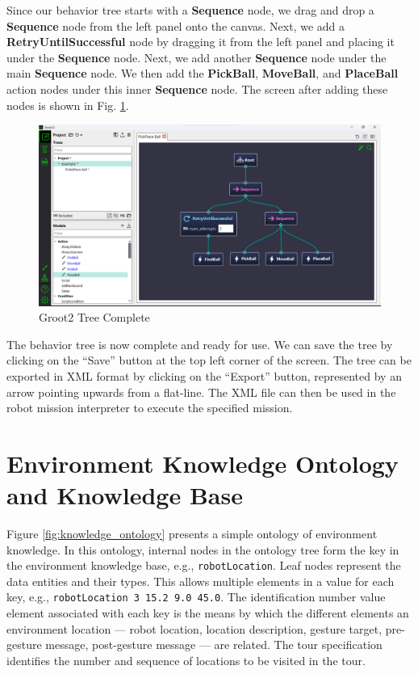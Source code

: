 \documentclass{CSSRforAfrica}
\begin{document}
Since our behavior tree starts with a \textbf{Sequence} node, we drag and drop a \textbf{Sequence} node from the left panel onto the canvas. Next, we add a \textbf{RetryUntilSuccessful} node by dragging it from the left panel and placing it under the \textbf{Sequence} node. Next, we add another \textbf{Sequence} node under the main \textbf{Sequence} node. We then add the \textbf{PickBall}, \textbf{MoveBall}, and \textbf{PlaceBall} action nodes under this inner \textbf{Sequence} node. The screen after adding these nodes is shown in Fig. \ref{fig:groo2_tree_complete}. 
\marginpar{\scriptsize }

\begin{figure}[H]
    \centering
    \includegraphics[width=120mm]{images/groot2_tree_complete.png}
    \caption{Groot2 Tree Complete}
    \label{fig:groo2_tree_complete}
\end{figure}

The behavior tree is now complete and ready for use. We can save the tree by clicking on the ``Save'' button at the top left corner of the screen. The tree can be exported in XML format by clicking on the ``Export'' button, represented by an arrow pointing upwards from a flat-line. The XML file can then be used in the robot mission interpreter to execute the specified mission.



\newpage

\section{Environment Knowledge Ontology and Knowledge Base}
\label{section:knowledge_base}

Figure \ref{fig:knowledge_ontology} presents a simple ontology of environment knowledge.
In this ontology, internal nodes in the ontology tree form the key in the environment knowledge base, e.g., {\small \tt robotLocation}.  Leaf nodes represent the data entities and their types.  This allows  multiple elements in a value for each key, e.g., {\small \tt robotLocation 3 15.2 9.0 45.0}.  The identification number value element associated with each key is the means by which the different elements an environment location ---  robot location,  location description,  gesture target,  pre-gesture message,  post-gesture message --- are related.  The tour specification identifies the number and sequence of locations to be visited in the tour.
\end{document}
